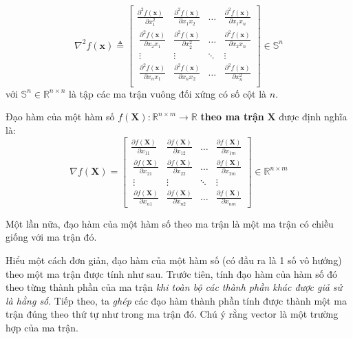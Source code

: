 \documentclass[12pt]{article}
\begin{document}
\begin{equation} 
\label{eqn:hessian1}
\nabla^2 f(\mathbf{x}) \triangleq 
\left[ 
\begin{matrix} 
    \frac{\partial^2 f(\mathbf{x})}{\partial x_1^2} & \frac{\partial^2 f(\mathbf{x})}{\partial x_1x_2} & \dots & \frac{\partial^2 f(\mathbf{x})}{\partial x_1x_n} \\\  
    \frac{\partial^2 f(\mathbf{x})}{\partial x_2x_1} & \frac{\partial^2 f(\mathbf{x})}{\partial x_2^2} & \dots & \frac{\partial^2 f(\mathbf{x})}{\partial x_2x_n} \\\  
    \vdots & \vdots & \ddots & \vdots \\\ 
    \frac{\partial^2 f(\mathbf{x})}{\partial x_nx_1} & \frac{\partial^2 f(\mathbf{x})}{\partial x_nx_2} & \dots & \frac{\partial^2 f(\mathbf{x})}{\partial x_n^2} \\\  
\end{matrix} 
\right] \in \mathbb{S}^{n}
\end{equation}  
với $\mathbb{S}^{n} \in \mathbb{R}^{n \times n}$ là tập các ma trận vuông đối xứng có số cột là $n$. 

Đạo hàm của một hàm số $f(\mathbf{X}): \mathbb{R}^{n \times m} \rightarrow \mathbb{R}$ \textbf{theo ma trận} $\mathbf{X}$ được định nghĩa là:  
\begin{equation}
\label{eqn:grmatrix1} 
\nabla f(\mathbf{X}) = 
\left[ 
\begin{matrix} 
    \frac{\partial f(\mathbf{X})}{\partial x_{11}} & \frac{\partial f(\mathbf{X})}{\partial x_{12}} & \dots & \frac{\partial f(\mathbf{X})}{\partial x_{1m}} \\\ 
    \frac{\partial f(\mathbf{X})}{\partial x_{21}} & \frac{\partial f(\mathbf{X})}{\partial x_{22}} & \dots & \frac{\partial f(\mathbf{X})}{\partial x_{2m}} \\\ 
    \vdots & \vdots & \ddots & \vdots \\\ 
    \frac{\partial f(\mathbf{X})}{\partial x_{n1}} & \frac{\partial f(\mathbf{X})}{\partial x_{n2}} & \dots & \frac{\partial f(\mathbf{X})}{\partial x_{nm}}  
\end{matrix} 
\right] \in \mathbb{R}^{n \times m}
\end{equation} 
 
Một lần nữa, đạo hàm của một hàm số theo ma trận là một ma trận có chiều giống với ma trận đó. 
 
Hiểu một cách đơn giản, đạo hàm của một hàm số (có đầu ra là 1 số vô hướng) theo một ma trận được tính như sau. Trước tiên, tính đạo hàm của hàm số đó theo từng thành phần của ma trận \textit{khi toàn bộ các thành phần khác được giả sử là hằng số}. Tiếp theo, ta \textit{ghép} các đạo hàm thành phần tính được thành một ma trận đúng theo thứ tự như trong ma trận đó. Chú ý rằng vector là một trường hợp của ma trận.  
 
\end{document}
